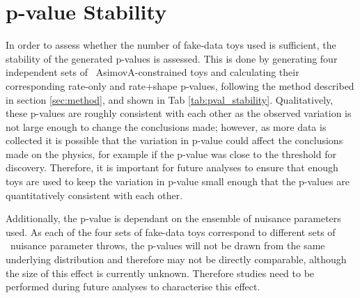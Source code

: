 \section{p-value Stability}\label{app:pval_stability}
In order to assess whether the number of fake-data toys used is sufficient, the stability of the generated p-values is assessed. This is done by generating four independent sets of \NToysFakeDataRatePlusShape\ AsimovA-{\color{red}constrained} toys and calculating their corresponding rate-only and rate+shape p-values, following the method described in section \ref{sec:method}, and shown in Tab \ref{tab:pval_stability}. Qualitatively, these p-values are roughly consistent with each other as the observed variation is not large enough to change the conclusions made; however, as more data is collected it is possible that the variation in p-value could affect the conclusions made on the physics, for example if the p-value was close to the threshold for discovery. Therefore, it is important for future analyses to ensure that enough toys are used to keep the variation in p-value small enough that the p-values are quantitatively consistent with each other.

Additionally, the p-value is dependant on the ensemble of nuisance parameters used. As each of the four sets of fake-data toys correspond to different sets of \NToysFakeDataRatePlusShape\ nuisance parameter throws, the p-values will not be drawn from the same underlying distribution and therefore may not be directly comparable, although the size of this effect is currently unknown. Therefore studies need to be performed during future analyses to characterise this effect.






